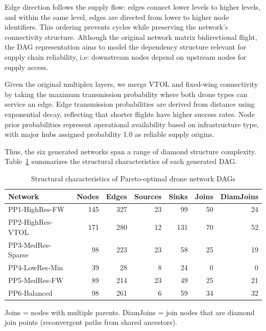Edge direction follows the supply flow: edges connect lower levels to higher levels, and within the same level, edges are directed from lower to higher node identifiers. This ordering prevents cycles while preserving the network's connectivity structure. Although the original network matrix  bidirectional flight, the DAG representation aims to model the dependency structure relevant for supply chain reliability, i.e: downstream nodes depend on upstream nodes for supply access.

Given the original multiplex layers, we merge VTOL and fixed-wing connectivity by taking the maximum transmission probability where both drone types can service an edge. Edge transmission probabilities are derived from distance using exponential decay, reflecting that shorter flights have higher success rates. Node prior probabilities represent operational availability based on infrastructure type, with major hubs assigned probability 1.0 as reliable supply origins.

Thus, the six generated networks span a range of diamond structure complexity. Table~\ref{tab:pareto_structure} summarizes the structural characteristics of each generated DAG.

\begin{table}[ht]
\caption{Structural characteristics of Pareto-optimal drone network DAGs}
\label{tab:pareto_structure}
\centering
\begin{tabular}{lrrrrrr}
\toprule
\textbf{Network} & \textbf{Nodes} & \textbf{Edges} & \textbf{Sources} & \textbf{Sinks} & \textbf{Joins} & \textbf{DiamJoins} \\
\midrule
PP1-HighRes-FW    & 145 & 327 & 23 &  99 & 50 & 24 \\
PP2-HighRes-VTOL  & 171 & 280 & 12 & 131 & 70 & 52 \\
PP3-MedRes-Sparse &  98 & 223 & 23 &  58 & 25 & 19 \\
PP4-LowRes-Min    &  39 &  28 &  8 &  24 &  0 &  0 \\
PP5-MedRes-FW     &  89 & 214 & 23 &  49 & 25 & 21 \\
PP6-Balanced      &  98 & 261 &  6 &  59 & 34 & 32 \\
\bottomrule
\end{tabular}
\begin{minipage}{\textwidth}
\footnotesize
Joins = nodes with multiple parents. DiamJoins = join nodes that are diamond join points (reconvergent paths from shared ancestors).
\end{minipage}
\end{table}


